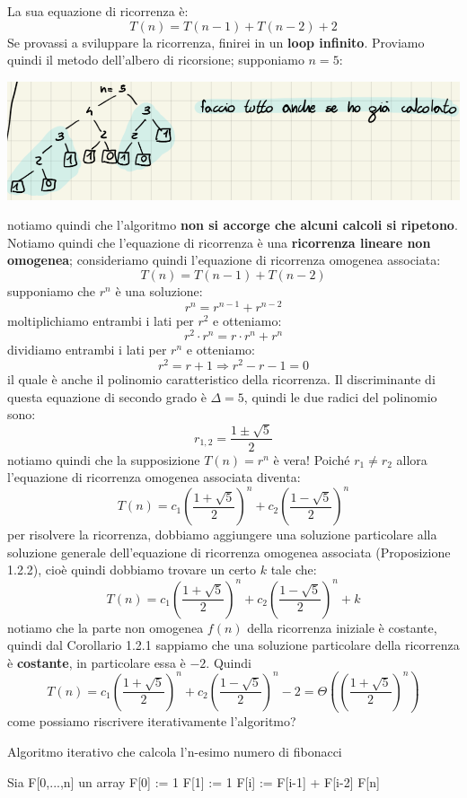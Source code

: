 \documentclass[12pt]{article}
\begin{document}
\noindent
La sua equazione di ricorrenza è:
$$T(n) = T(n-1) + T(n-2) + 2$$
Se provassi a sviluppare la ricorrenza, finirei in un \textbf{loop infinito}. 
Proviamo quindi il metodo dell'albero di ricorsione; supponiamo $n = 5$:
\begin{center}
    \includegraphics[width = 1\linewidth]{Images/4.png}
\end{center}
notiamo quindi che l'algoritmo \textbf{non si accorge che alcuni calcoli si ripetono}. Notiamo quindi
che l'equazione di ricorrenza è una \textbf{ricorrenza lineare non omogenea}; consideriamo quindi l'equazione
di ricorrenza omogenea associata:
$$T(n) = T(n-1) + T(n-2)$$
supponiamo che $r^n$ è una soluzione:
$$r^n = r^{n-1} + r^{n-2}$$
moltiplichiamo entrambi i lati per $r^2$ e otteniamo:
$$r^2 \cdot r^n = r \cdot r^n + r^n$$
dividiamo entrambi i lati per $r^n$ e otteniamo:
$$r^2 = r + 1 \Rightarrow r^2 - r - 1 = 0$$
il quale è anche il polinomio caratteristico della ricorrenza. Il discriminante di questa equazione di secondo grado è $\Delta = 5$, quindi le due radici del polinomio sono:
$$r_{1,2} = \frac{1 \pm \sqrt{5}}{2}$$
notiamo quindi che la supposizione $T(n) = r^n$ è vera! Poiché $r_1 \neq r_2$ allora l'equazione di ricorrenza omogenea associata diventa:
$$T(n) = c_1 \left (\frac{1 + \sqrt{5}}{2} \right )^n + c_2 \left (\frac{1 - \sqrt{5}}{2} \right )^n$$
per risolvere la ricorrenza, dobbiamo aggiungere una soluzione particolare alla soluzione generale dell'equazione di ricorrenza omogenea associata (Proposizione 1.2.2), cioè quindi dobbiamo
trovare un certo $k$ tale che:
$$T(n) = c_1 \left (\frac{1 + \sqrt{5}}{2} \right )^n + c_2 \left (\frac{1 - \sqrt{5}}{2} \right )^n + k$$
notiamo che la parte non omogenea $f(n)$ della ricorrenza iniziale è costante, quindi dal Corollario 1.2.1 sappiamo che una soluzione particolare
della ricorrenza è \textbf{costante}, in particolare essa è $-2$. Quindi
$$T(n) = c_1 \left (\frac{1 + \sqrt{5}}{2} \right)^n + c_2 \left (\frac{1 - \sqrt{5}}{2} \right )^n - 2 = \Theta\left ( \left (\frac{1 + \sqrt{5}}{2} \right )^n \right )$$
come possiamo riscrivere iterativamente l'algoritmo? \newline
\begin{algorithm}[H]
    \caption{Algoritmo iterativo che calcola l'n-esimo numero di fibonacci}
    \DontPrintSemicolon
     {
        Sia F[0,...,n] un array\;
        F[0] := 1\;
        F[1] := 1\;
         {
            F[i] := F[i-1] + F[i-2]\;
        }
        \Return F[n]
    }
\end{algorithm}
\end{document}
